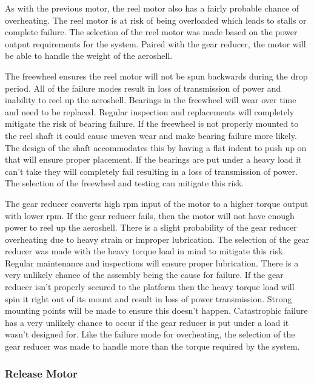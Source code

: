 \indent\indent  As with the previous motor, the reel motor also has a fairly probable chance of overheating. The reel motor is at risk of being overloaded which leads to stalls or complete failure. The selection of the reel motor was made based on the power output requirements for the system. Paired with the gear reducer, the motor will be able to handle the weight of the aeroshell. 

\indent\indent The freewheel ensures the reel motor will not be spun backwards during the drop period. All of the failure modes result in loss of transmission of power and inability to reel up the aeroshell. Bearings in the freewheel will wear over time and need to be replaced. Regular inspection and replacements will completely mitigate the risk of bearing failure. If the freewheel is not properly mounted to the reel shaft it could cause uneven wear and make bearing failure more likely. The design of the shaft accommodates this by having a flat indent to push up on that will ensure proper placement. If the bearings are put under a heavy load it can’t take  they will completely fail resulting in a loss of transmission of power. The selection of the freewheel and testing can mitigate this risk. 
	
\indent\indent The gear reducer converts high rpm input of the motor to a higher torque output with lower rpm. If the gear reducer fails, then the motor will not have enough power to reel up the aeroshell. There is a slight probability of the gear reducer overheating due to heavy strain or improper lubrication. The selection of the gear reducer was made with the heavy torque load in mind to mitigate this risk. Regular maintenance and inspections will ensure proper lubrication. There is a very unlikely chance of the assembly being the cause for failure. If the gear reducer isn’t properly secured to the platform then the heavy torque load will spin it right out of its mount and result in loss of power transmission. Strong mounting points will be made to ensure this doesn’t happen. Catastrophic failure has a very unlikely chance to occur if the gear reducer is put under a load it wasn’t designed for. Like the failure mode for overheating, the selection of the gear reducer was made to handle more than the torque required by the system.



\subsubsection{Release Motor}

